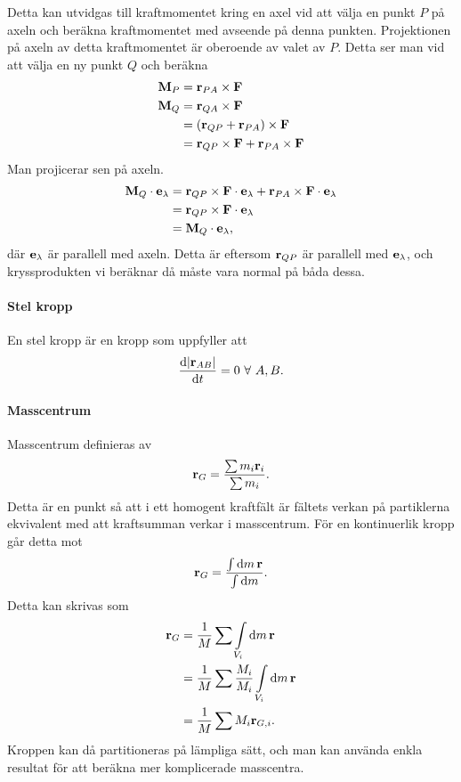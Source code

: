 Detta kan utvidgas till kraftmomentet kring en axel vid att välja en punkt $P$ på axeln och beräkna kraftmomentet med avseende på denna punkten. Projektionen på axeln av detta kraftmomentet är oberoende av valet av $P$. Detta ser man vid att välja en ny punkt $Q$ och beräkna
\begin{align*}
	\vect{M}_P &= \vect{r}_{PA}\times\vect{F} \\
	\vect{M}_Q &= \vect{r}_{QA}\times\vect{F} \\
	           &= (\vect{r}_{QP} + \vect{r}_{PA})\times\vect{F} \\
	           &= \vect{r}_{QP}\times\vect{F} + \vect{r}_{PA}\times\vect{F}
\end{align*}
Man projicerar sen på axeln.
\begin{align*}
	\vect{M}_Q\cdot\vect{e}_\lambda &= \vect{r}_{QP}\times\vect{F}\cdot\vect{e}_\lambda + \vect{r}_{PA}\times\vect{F}\cdot\vect{e}_\lambda \\
	                                &= \vect{r}_{QP}\times\vect{F}\cdot\vect{e}_\lambda \\
	                                &= \vect{M}_Q\cdot\vect{e}_\lambda,
\end{align*}
där $\vect{e}_\lambda$ är parallell med axeln. Detta är eftersom $\vect{r}_{QP}$ är parallell med $\vect{e}_\lambda$, och kryssprodukten vi beräknar då måste vara normal på båda dessa.

\paragraph{Stel kropp}
En stel kropp är en kropp som uppfyller att
\begin{align*}
	\dv{\abs{\vect{r}_{AB}}}{t} = 0\ \forall\ A, B. 
\end{align*}

\paragraph{Masscentrum}
Masscentrum definieras av
\begin{align*}
	\vect{r}_G = \frac{\sum m_i\vect{r}_i}{\sum m_i}.
\end{align*}
Detta är en punkt så att i ett homogent kraftfält är fältets verkan på partiklerna ekvivalent med att kraftsumman verkar i masscentrum. För en kontinuerlik kropp går detta mot
\begin{align*}
	\vect{r}_G = \frac{\int\dd{m}\vect{r}}{\int\dd{m}}.
\end{align*}
Detta kan skrivas som
\begin{align*}
	\vect{r}_G &= \frac{1}{M}\sum\int\limits_{V_i}\dd{m}\vect{r} \\
	           &= \frac{1}{M}\sum\frac{M_i}{M_i}\int\limits_{V_i}\dd{m}\vect{r} \\
	           &= \frac{1}{M}\sum M_i\vect{r}_{G, i}.
\end{align*}
Kroppen kan då partitioneras på lämpliga sätt, och man kan använda enkla resultat för att beräkna mer komplicerade masscentra.

